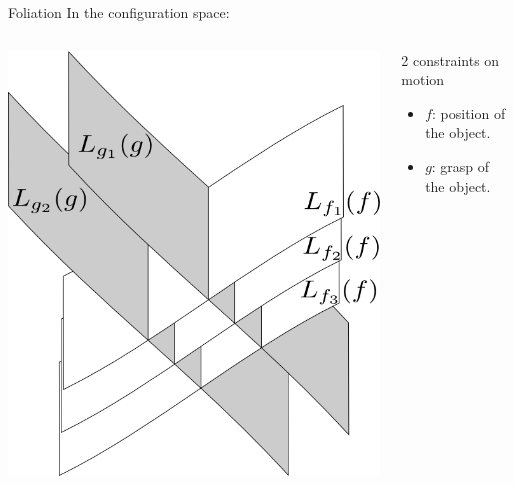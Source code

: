 \begin{frame}{Foliation}
  In the configuration space:

  \begin{columns}
    \includegraphics[width=1\textwidth,height=1\textheight,keepaspectratio]{figures/foliation.png}
    \begin{block}{2 constraints on motion}
      \begin{itemize}
        \item $f$: position of the object.
        \item $g$: grasp of the object.
      \end{itemize}
    \end{block}
  \end{columns}
\end{frame}

